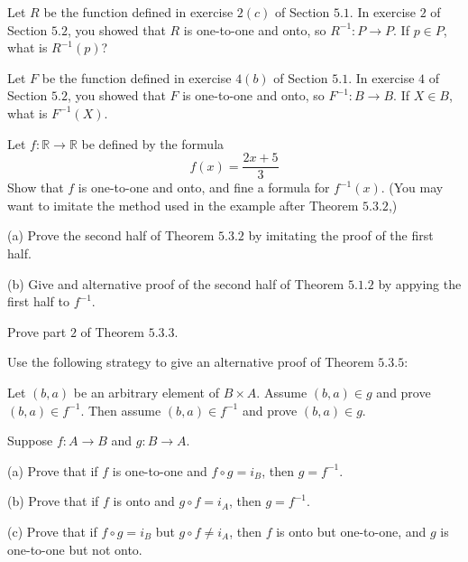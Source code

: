 \begin{tcolorbox}[title=Problem 1, breakable]
    Let $R$ be the function defined in exercise $2(c)$ of Section $5.1$.
    In exercise $2$ of Section $5.2$, you showed that $R$ is one-to-one
    and onto, so $R^{-1} : P \rightarrow P$. If $p \in P$,
    what is $R^{-1}(p)$?
\end{tcolorbox}

\begin{tcolorbox}[title=Problem 2, breakable]
    Let $F$ be the function defined in exercise $4(b)$ of Section $5.1$.
    In exercise $4$ of Section $5.2$, you showed that $F$ is one-to-one 
    and onto, so $F^{-1} : B \rightarrow B$. If $X \in B$,
    what is $F^{-1}(X)$.
\end{tcolorbox}

\begin{tcolorbox}[title=Problem 3, breakable]
    Let $f : \mathbb{R} \rightarrow \mathbb{R}$ be defined by the formula 
    \[f(x) = \frac{2x + 5}{3}\]
    Show that $f$ is one-to-one and onto, and fine a formula for $f^{-1}(x)$.
    (You may want to imitate the method used in the example after Theorem $5.3.2$,)
\end{tcolorbox}

\begin{tcolorbox}[title=Problem 8, breakable]
    (a) Prove the second half of Theorem $5.3.2$ by imitating the proof of the first half.

    (b) Give and alternative proof of the second half of Theorem $5.1.2$ by appying the 
        first half to $f^{-1}$.
\end{tcolorbox}

\begin{tcolorbox}[title=Problem 9, breakable]
    Prove part $2$ of Theorem $5.3.3$.
\end{tcolorbox}

\begin{tcolorbox}[title=Problem 10, breakable]
    Use the following strategy to give an alternative proof  of Theorem $5.3.5$:
    
    Let $(b, a)$ be an arbitrary element of $B \times A$.
    Assume $(b, a) \in g$ and prove $(b, a) \in f^{-1}$.
    Then assume $(b, a) \in f^{-1}$ and prove $(b, a) \in g$.
\end{tcolorbox}

\begin{tcolorbox}[title=Problem 11, breakable]
    Suppose $f : A \rightarrow B$ and $g : B \rightarrow A$.

    (a) Prove that if $f$ is one-to-one and $f \circ g = i_B$, then $g = f^{-1}$.

    (b) Prove that if $f$ is onto and $g \circ f = i_A$, then $g = f^{-1}$.

    (c) Prove that if $f \circ g = i_B$ but $g \circ f \ne i_A$, then $f$ is onto 
        but one-to-one, and $g$ is one-to-one but not onto.
\end{tcolorbox}

